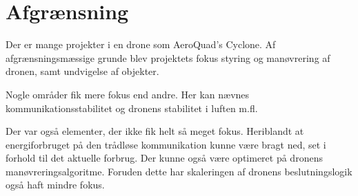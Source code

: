 \documentclass[Main]{subfiles}
\begin{document}
\section{Afgrænsning}
Der er mange projekter i en drone som AeroQuad's Cyclone. 
Af afgrænsningsmæssige grunde  blev projektets fokus styring og manøvrering af dronen, samt  undvigelse af objekter. 

Nogle områder fik mere fokus end andre. Her kan nævnes kommunikationsstabilitet og dronens stabilitet i luften  m.fl. 

Der var også elementer, der ikke fik helt så meget fokus. 
Heriblandt at energiforbruget på den trådløse kommunikation kunne være bragt ned, set i forhold til det aktuelle forbrug. 
Der kunne også være optimeret på dronens manøvreringsalgoritme.
Foruden dette har skaleringen af dronens beslutningslogik også haft mindre fokus.
\end{document}
